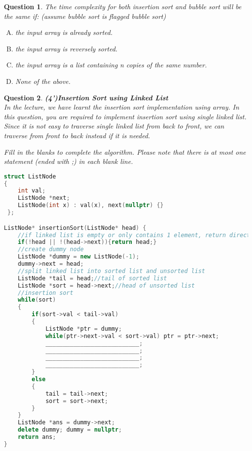 \documentclass[10.5pt]{article}
\newtheorem{Q}{Question}
\begin{document}
	\begin{Q}
		The time complexity for both insertion sort and bubble sort will be the same if: (assume bubble sort is flagged bubble sort)
		\begin{enumerate}[(A)]
			\item the input array is already sorted.
			\item the input array is reversely sorted.
			\item the input array is a list containing n copies of the same number.
			\item None of the above.
		\end{enumerate}
	\end{Q}
	\vspace{6cm}
	\begin{Q}\textbf{(4')Insertion Sort using Linked List}\\
		 In the lecture, we have learnt the insertion sort implementation using array. In this question, you are required to implement insertion sort using single linked list. Since it is not easy to traverse single linked list from back to front, we can traverse from front to back instead if it is needed.
		 
		 Fill in the blanks to complete the algorithm. Please note that there is at most one statement (ended with ;) in each blank line. 
		 
\hrulefill
\rm{
\begin{lstlisting}[language=C++]
struct ListNode 
{
    int val;
 	ListNode *next;
 	ListNode(int x) : val(x), next(nullptr) {}
 };

ListNode* insertionSort(ListNode* head) {
    //if linked list is empty or only contains 1 element, return directly
    if(!head || !(head->next)){return head;}
    //create dummy node
    ListNode *dummy = new ListNode(-1);
    dummy->next = head;
    //split linked list into sorted list and unsorted list
    ListNode *tail = head;//tail of sorted list
    ListNode *sort = head->next;//head of unsorted list
    //insertion sort
    while(sort)
    {
        if(sort->val < tail->val)
        {
            ListNode *ptr = dummy;
            while(ptr->next->val < sort->val) ptr = ptr->next;
            ___________________________;
            ___________________________;
            ___________________________;
            ___________________________;
        }
        else
        {	
            tail = tail->next;
            sort = sort->next;
        }
    }
    ListNode *ans = dummy->next;
    delete dummy; dummy = nullptr;
    return ans;
}
\end{lstlisting}
}
		\vspace{1cm}
	\end{Q}
	
\end{document}
